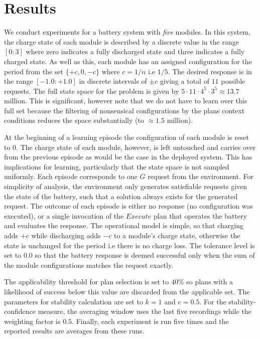 \section{Results}\label{sec:results}

We conduct experiments for a battery system with {\em five} modules. In this system, the charge state of each module is described by a discrete value in the range $[0:3]$ where zero indicates a fully discharged state and three indicates a fully charged state. As well as this, each module has an assigned configuration for the period from the set $\{+c, 0, -c\}$ where $c=1/n$ i.e $1/5$. The desired response is in the range $[-1.0:+1.0]$ in discrete intervals of $\pm c$ giving a total of $11$ possible requests. The full state space for the problem is given by $5 \cdot 11 \cdot 4^5 \cdot 3^5 \approx 13.7$ million. This is significant, however note that we do not have to learn over this full set because the filtering of nonsensical configurations by the plans context conditions reduces the space substantially (to $\approx 1.5$ million).


At the beginning of a learning episode the configuration of each module is reset to $0$. The charge state of each module, however, is left untouched and carries over from the previous episode as would be the case in the deployed system. This has implications for learning, particularly that the state space is not sampled uniformly. Each episode corresponds to one $G$ request from the environment. For simplicity of analysis, the environment only generates satisfiable requests given the state of the battery, such that a solution always exists for the generated request. The outcome of each episode is either no response (no configuration was executed), or a single invocation of the $Execute$ plan that operates the battery and evaluates the response. The operational model is simple, so that charging adds $+c$ while discharging adds $-c$ to a module's charge state, otherwise the state is unchanged for the period i.e there is no charge loss. The tolerance level is set to $0.0$ so that the battery response is deemed successful only when the sum of the module configurations matches the request exactly.

The applicability threshold for plan selection is set to $40\%$ so plans with a likelihood of success below this value are discarded from the applicable set. The parameters for stability calculation are set to $k=1$ and $e=0.5$. For the stability-confidence measure, the averaging window uses the last five recordings while the weighting factor is $0.5$. Finally, each experiment is run five times and the reported results are averages from these runs.

